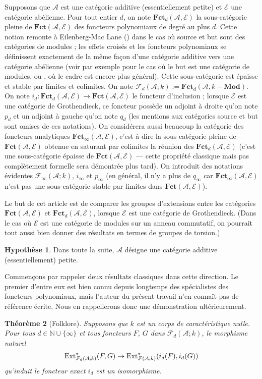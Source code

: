 \documentclass[a4paper,10pt]{article}
\newcommand{\A}{{\mathcal{A}}}
\newcommand{\F}{{\mathcal{F}}}
\newcommand{\fct}{\mathbf{Fct}}
\newcommand{\E}{{\mathcal{E}}}
\newcommand{\Pol}{\fct}
\newtheorem{thm}{Th\'eor\`eme}[section]
\theoremstyle{definition}
\newtheorem{hyp}[thm]{Hypoth\`ese}
\theoremstyle{remark}
\begin{document}
Supposons que $\A$ est une catégorie additive (essentiellement petite) et $\E$ une catégorie abélienne. Pour tout entier $d$, on note $\Pol_d(\A,\E)$ la sous-catégorie pleine de $\fct(\A,\E)$ des foncteurs polynomiaux de degré au plus $d$. Cette notion remonte à Eilenberg-Mac Lane (\cite{EML}) dans le cas où source et but sont des catégories de modules ; les effets croisés et les foncteurs polynomiaux se définissent exactement de la même façon d'une catégorie additive vers une catégorie abélienne (voir par exemple \cite{P-extor} pour le cas où le but est une catégorie de modules, ou \cite{HPV}, où le cadre est encore plus général). Cette sous-catégorie est épaisse et stable par limites et colimites. On note $\F_d(\A;k):=\Pol_d(\A,k-\mathbf{Mod})$. On note $i_d : \Pol_d(\A,\E)\to\fct(\A,\E)$ le foncteur d'inclusion ; lorsque $\E$ est une catégorie de Grothendieck, ce foncteur possède un adjoint à droite qu'on note $p_d$ et un adjoint à gauche qu'on note $q_d$ (les mentions aux catégories source et but sont omises de ces notations). On considérera aussi beaucoup la catégorie des foncteurs analytiques $\Pol_\infty(\A,\E)$, c'est-à-dire la sous-catégorie pleine de $\fct(\A,\E)$ obtenue en saturant par colimites la réunion des $\Pol_d(\A,\E)$ (c'est une sous-catégorie épaisse de $\fct(\A,\E)$ --- cette propriété classique mais pas complètement formelle sera démontrée plus tard). On introduit des notations évidentes $\F_\infty(\A;k)$, $i_\infty$ et $p_\infty$ (en général, il n'y a plus de $q_\infty$ car $\Pol_\infty(\A,\E)$ n'est pas une sous-catégorie stable par limites dans $\fct(\A,\E)$).

Le but de cet article est de comparer les groupes d'extensions entre les catégories $\fct(\A,\E)$ et $\Pol_d(\A,\E)$, lorsque $\E$ est une catégorie de Grothendieck. (Dans le cas où $\E$ est une catégorie de modules sur un anneau commutatif, on pourrait tout aussi bien donner des résultats en termes de groupes de torsion.)

\begin{hyp}
 Dans toute la suite, $\A$ désigne une catégorie additive (essentiellement) petite.
\end{hyp}


Commençons par rappeler deux résultats classiques dans cette direction. Le premier d'entre eux est bien connu depuis longtemps des spécialistes des foncteurs polynomiaux, mais l'auteur du présent travail n'en connaît pas de référence écrite. Nous en rappellerons donc une démonstration ultérieurement.

\begin{thm}[Folklore]\label{th-fol}
 Supposons que $k$ est un corps de caractéristique nulle. Pour tous $d\in\mathbb{N}\cup\{\infty\}$ et tous foncteurs $F$, $G$ dans $\F_d(\A;k)$, le morphisme naturel
$${\rm Ext}^*_{\F_d(\A;k)}(F,G)\to {\rm Ext}^*_{\F(\A;k)}(i_d(F),i_d(G))$$
qu'induit le foncteur exact $i_d$ est un isomorphisme.
\end{thm}
\end{document}
